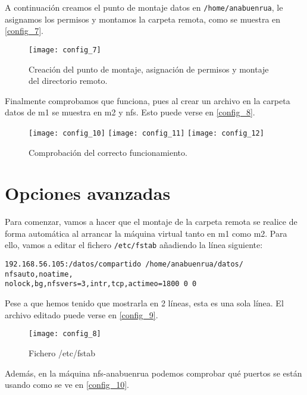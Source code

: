A continuación creamos el punto de montaje datos en \verb|/home/anabuenrua|, le asignamos los permisos y montamos la carpeta remota, como se muestra en \eqref{config_7}.

\begin{figure}[h!]
\begin{center}
\caption{Creación del punto de montaje, asignación de permisos y montaje del directorio remoto.}
\label{config_7}
\texttt{[image: config\_7]}
\end{center}
\end{figure}

Finalmente comprobamos que funciona, pues al crear un archivo en la carpeta datos de m1 se muestra en m2 y nfs. Esto puede verse en \eqref{config_8}.

\begin{figure}[h!]
\begin{center}
\caption{Comprobación del correcto funcionamiento.}
\label{config_8}
\texttt{[image: config\_10]}
\texttt{[image: config\_11]}
\texttt{[image: config\_12]}
\end{center}
\end{figure}

\section{Opciones avanzadas}

Para comenzar, vamos a hacer que el montaje de la carpeta remota se realice de forma automática al arrancar la máquina virtual tanto en m1 como m2. Para ello, vamos a editar el fichero \verb|/etc/fstab| añadiendo la línea siguiente:

\begin{verbatim}
192.168.56.105:/datos/compartido /home/anabuenrua/datos/ nfsauto,noatime,
nolock,bg,nfsvers=3,intr,tcp,actimeo=1800 0 0
\end{verbatim}

Pese a que hemos tenido que mostrarla en 2 líneas, esta es una sola línea. El archivo editado puede verse en \eqref{config_9}.

\begin{figure}[h!]
\begin{center}
\caption{Fichero /etc/fstab}
\label{config_9}
\texttt{[image: config\_8]}
\end{center}
\end{figure}

Además, en la máquina nfs-anabuenrua podemos comprobar qué puertos se están usando como se ve en \eqref{config_10}.

